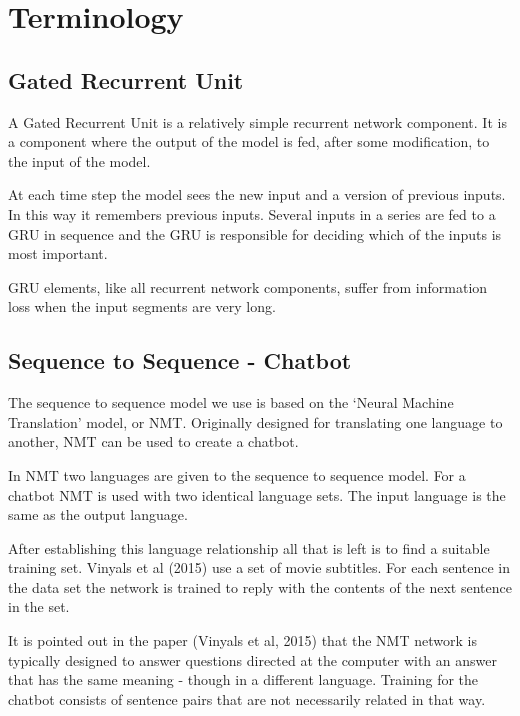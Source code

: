 \chapter{Terminology}

\section{Gated Recurrent Unit}

A Gated Recurrent Unit is a relatively simple recurrent network component. It is a component 
where the output of the model is fed, after some modification, to the input of the model. 

At each time step the model sees the new input and a version of previous inputs. In this
way it remembers previous inputs. Several inputs in a series are fed to a GRU in sequence and the GRU is responsible for deciding which of the inputs is most important.

GRU elements, like all recurrent network components, suffer from information loss when the
input segments are very long.

\section{Sequence to Sequence - Chatbot}

The sequence to sequence model we use is based on the \textquoteleft Neural
Machine Translation\textquoteright{} model, or NMT. Originally designed
for translating one language to another, NMT can be used to create
a chatbot.

In NMT two languages are given to the sequence to sequence model.
For a chatbot NMT is used with two identical language sets. The input
language is the same as the output language.

After establishing this language relationship all that is left is
to find a suitable training set. Vinyals et al (2015)\cite{DBLP:journals/corr/VinyalsL15}
use a set of movie subtitles. For each sentence in the data set the
network is trained to reply with the contents of the next sentence
in the set.

It is pointed out in the paper (Vinyals et al, 2015)\cite{DBLP:journals/corr/VinyalsL15}
that the NMT network is typically designed to answer questions directed
at the computer with an answer that has the same meaning - though
in a different language. Training for the chatbot consists of sentence
pairs that are not necessarily related in that way. 

